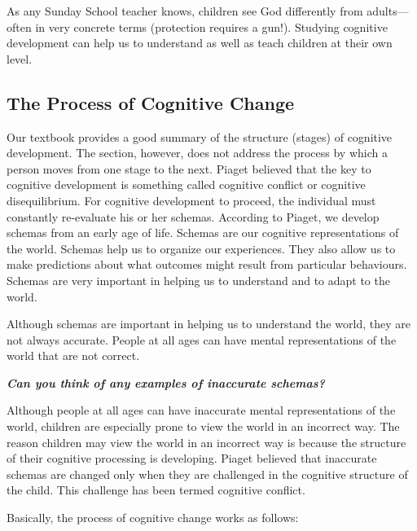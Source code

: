 \documentclass[
]{book}
\begin{document}
As any Sunday School teacher knows, children see God differently from adults---often in very concrete terms (protection requires a gun!). Studying cognitive development can help us to understand as well as teach children at their own level.

\hypertarget{the-process-of-cognitive-change}{%
\subsection*{The Process of Cognitive Change}\label{the-process-of-cognitive-change}}

Our textbook provides a good summary of the structure (stages) of cognitive development. The section, however, does not address the process by which a person moves from one stage to the next. Piaget believed that the key to cognitive development is something called cognitive conflict or cognitive disequilibrium. For cognitive development to proceed, the individual must constantly re-evaluate his or her schemas. According to Piaget, we develop schemas from an early age of life. Schemas are our cognitive representations of the world. Schemas help us to organize our experiences. They also allow us to make predictions about what outcomes might result from particular behaviours. Schemas are very important in helping us to understand and to adapt to the world.

Although schemas are important in helping us to understand the world, they are not always accurate. People at all ages can have mental representations of the world that are not correct.

\textbf{\emph{Can you think of any examples of inaccurate schemas?}}

Although people at all ages can have inaccurate mental representations of the world, children are especially prone to view the world in an incorrect way. The reason children may view the world in an incorrect way is because the structure of their cognitive processing is developing. Piaget believed that inaccurate schemas are changed only when they are challenged in the cognitive structure of the child. This challenge has been termed cognitive conflict.

Basically, the process of cognitive change works as follows:
\end{document}
